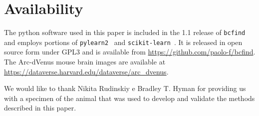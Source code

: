 \documentclass[smallextended]{svjour3}       %
\begin{document}
\section*{Availability}
The python software used in this paper is included in the 1.1 release
of \texttt{bcfind}~\cite{frasconi_large-scale_2014} and employs
portions of \texttt{pylearn2}~\cite{goodfellow_pylearn2:_2013} and
\texttt{scikit-learn}~\cite{pedregosa_scikit-learn:_2011}. It is released in open source form
under GPL3 and is available from \url{https://github.com/paolo-f/bcfind}.
The Arc-dVenus mouse brain images
are available at
\url{https://dataverse.harvard.edu/dataverse/arc_dvenus}.

\begin{acknowledgements}
  We would like to thank Nikita Rudinskiy e Bradley T. Hyman for
  providing us with a specimen of the animal that was used to develop
  and validate the methods described in this paper.
\end{acknowledgements}

\end{document}
